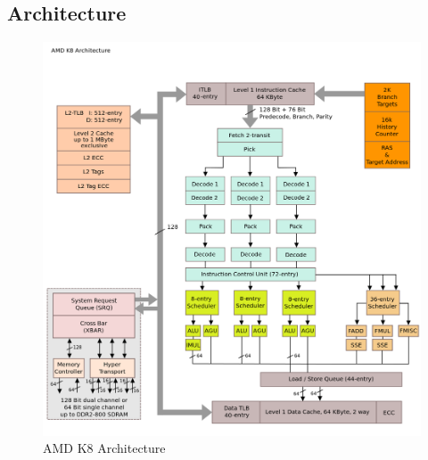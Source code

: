 \documentclass[letterpaper,10pt,compsoc,draftclsnofoot,onecolumn]{IEEEtran}
\begin{document}
\subsection{Architecture}
\begin{figure}[!bhpt]
\captionsetup{justification=centering, aboveskip=2em, belowskip=0em}
\begin{minipage}{0.5\textwidth}
\centering\includegraphics[scale=0.2]{figures/AMD_K8}
\caption{AMD K8 Architecture\cite{amd_k8}}
\label{fig:K8}
\end{minipage}
%
\captionsetup{justification=centering, aboveskip=2em, belowskip=0em}
\begin{minipage}{0.5\textwidth}

\end{minipage}
\end{figure}
\end{document}
